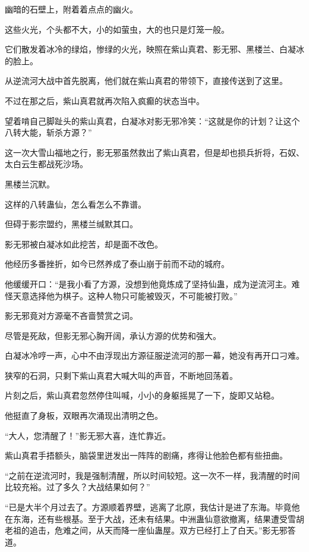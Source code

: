 
\begin{this_body}



幽暗的石壁上，附着着点点的幽火。

这些火光，个头都不大，小的如萤虫，大的也只是灯笼一般。

它们散发着冰冷的绿焰，惨绿的火光，映照在紫山真君、影无邪、黑楼兰、白凝冰的脸上。

从逆流河大战中首先脱离，他们就在紫山真君的带领下，直接传送到了这里。

不过在那之后，紫山真君就再次陷入疯癫的状态当中。

望着啃自己脚趾头的紫山真君，白凝冰对影无邪冷笑：“这就是你的计划？让这个八转大能，斩杀方源？”

这一次大雪山福地之行，影无邪虽然救出了紫山真君，但是却也损兵折将，石奴、太白云生都战死沙场。

黑楼兰沉默。

这样的八转蛊仙，怎么看怎么不靠谱。

但碍于影宗盟约，黑楼兰缄默其口。

影无邪被白凝冰如此挖苦，却是面不改色。

他经历多番挫折，如今已然养成了泰山崩于前而不动的城府。

他缓缓开口：“是我小看了方源，没想到他竟炼成了坚持仙蛊，成为逆流河主。难怪天意选择他为棋子。这种人物只可能被毁灭，不可能被打败。”

影无邪竟对方源毫不吝啬赞赏之词。

尽管是死敌，但影无邪心胸开阔，承认方源的优势和强大。

白凝冰冷哼一声，心中不由浮现出方源征服逆流河的那一幕，她没有再开口刁难。

狭窄的石洞，只剩下紫山真君大喊大叫的声音，不断地回荡着。

片刻之后，紫山真君忽然停住叫喊，小小的身躯摇晃了一下，旋即又站稳。

他挺直了身板，双眼再次涌现出清明之色。

“大人，您清醒了！”影无邪大喜，连忙靠近。

紫山真君手捂额头，脑袋里迸发出一阵阵的剧痛，疼得让他脸色都有些扭曲。

“之前在逆流河时，我是强制清醒，所以时间较短。这一次不一样，我清醒的时间比较充裕。过了多久？大战结果如何？”

“已是大半个月过去了。方源顺着界壁，逃离了北原，我估计是进了东海。毕竟他在东海，还有些根基。至于大战，还未有结果。中洲蛊仙意欲撤离，结果遭受雪胡老祖的追击，危难之间，从天而降一座仙蛊屋。双方已经打上了白天。”影无邪答道。


\end{this_body}
